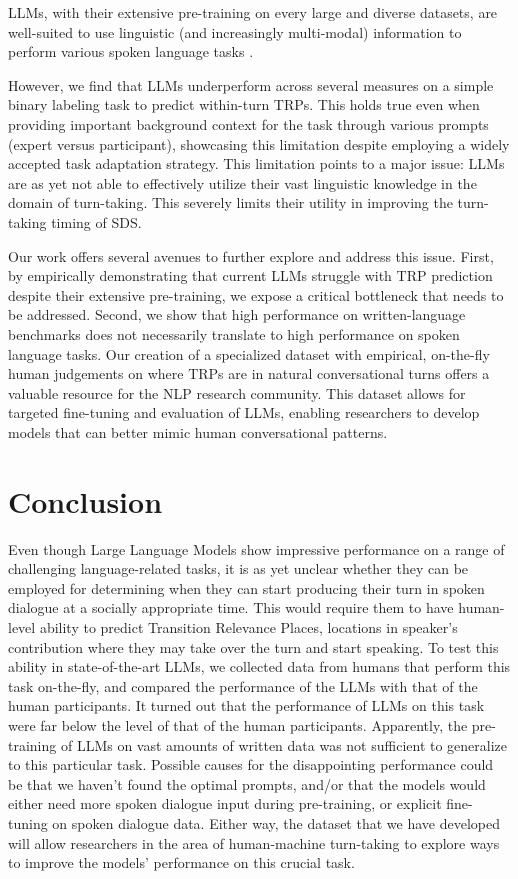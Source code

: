 LLMs, with their extensive pre-training on every large and diverse datasets, are well-suited to use linguistic (and increasingly multi-modal) information to perform various spoken language tasks \cite{ekstedt2020turngpt,jiang-etal-2023-response,jiang2023makes}.

However, we find that LLMs underperform across several measures on a simple binary labeling task to predict within-turn TRPs. This holds true even when providing important background context for the task through various prompts (expert versus participant), showcasing this limitation despite employing a widely accepted task adaptation strategy. This limitation points to a major issue: LLMs are as yet not able to effectively utilize their vast linguistic knowledge in the domain of turn-taking. This severely limits their utility in improving the turn-taking timing of SDS.

Our work offers several avenues to further explore and address this issue. First, by empirically demonstrating that current LLMs struggle with TRP prediction despite their extensive pre-training, we expose a critical bottleneck that needs to be addressed. Second, we show that high performance on written-language benchmarks does not necessarily translate to high performance on spoken language tasks. Our creation of a specialized dataset with empirical, on-the-fly human judgements on where TRPs are in natural conversational turns offers a valuable resource for the NLP research community. This dataset allows for targeted fine-tuning and evaluation of LLMs, enabling researchers to develop models that can better mimic human conversational patterns.

\section{Conclusion}

Even though Large Language Models show impressive performance on a range of challenging language-related tasks, it is as yet unclear whether they can be employed for determining when they can start producing their turn in spoken dialogue at a socially appropriate time. This would require them to have human-level ability to predict Transition Relevance Places, locations in speaker's contribution where they may take over the turn and start speaking. To test this ability in state-of-the-art LLMs, we collected data from humans that perform this task on-the-fly, and compared the performance of the LLMs with that of the human participants. It turned out that the performance of LLMs on this task were far below the level of that of the human participants. Apparently, the pre-training of LLMs on vast amounts of written data was not sufficient to generalize to this particular task. Possible causes for the disappointing performance could be that we haven't found the optimal prompts, and/or that the models would either need more spoken dialogue input during pre-training, or explicit fine-tuning on spoken dialogue data. Either way, the dataset that we have developed will allow researchers in the area of human-machine turn-taking to explore ways to improve the models' performance on this crucial task.

